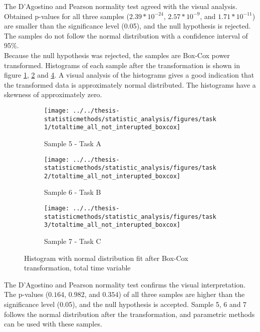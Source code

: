 The D'Agostino and Pearson normality test agreed with the visual analysis. Obtained p-values for all three samples ($2.39 * 10^{-24}$, $2.57 * 10^{-9}$, and $1.71 * 10^{-11}$) are smaller than the significance level (0.05), and the null hypothesis is rejected. The samples do not follow the normal distribution with a confidence interval of 95\%.\\[0.2cm]

Because the null hypothesis was rejected, the samples are Box-Cox power transformed. Histograms of each sample after the transformation is shown in figure \ref{fig:totaltimeallnotinteruptedboxcox_task1}, \ref{fig:totaltimeallnotinteruptedboxcox_task2} and \ref{fig:totaltimeallnotinteruptedboxcox_task3}. A visual analysis of the histograms gives a good indication that the transformed data is approximately normal distributed. The histograms have a skewness of approximately zero. 

\begin{figure}[h!]
	\centering
	\begin{subfigure}[b]{0.3\textwidth}
		\centering
		\texttt{[image: ../../thesis-statisticmethods/statistic\_analysis/figures/task1/totaltime\_all\_not\_interupted\_boxcox]}
		\caption{Sample 5 - Task A}
		\label{fig:totaltimeallnotinteruptedboxcox_task1}
	\end{subfigure}
	\begin{subfigure}[b]{0.3\textwidth}
		\centering
		\texttt{[image: ../../thesis-statisticmethods/statistic\_analysis/figures/task2/totaltime\_all\_not\_interupted\_boxcox]}
		\caption{Sample 6 - Task B}
		\label{fig:totaltimeallnotinteruptedboxcox_task2}
	\end{subfigure}
	\begin{subfigure}[b]{0.3\textwidth}
		\centering
		\texttt{[image: ../../thesis-statisticmethods/statistic\_analysis/figures/task3/totaltime\_all\_not\_interupted\_boxcox]}
		\caption{Sample 7 - Task C}
		\label{fig:totaltimeallnotinteruptedboxcox_task3}
	\end{subfigure}
	\caption{Histogram with normal distribution fit after Box-Cox transformation, total time variable}
\end{figure}

The D'Agostino and Pearson normality test confirms the visual interpretation. The p-values ($0.164$, $0.982$, and $0.354$) of all three samples are higher than the significance level (0.05), and the null hypothesis is accepted. Sample 5, 6 and 7 follows the normal distribution after the transformation, and parametric methods can be used with these samples.
 
